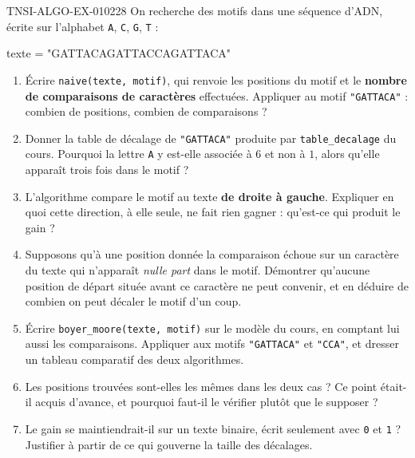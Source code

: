 \begin{exercice}{TNSI-ALGO-EX-010}{2}{28}
On recherche des motifs dans une séquence d'ADN, écrite sur l'alphabet
\lstinline{A}, \lstinline{C}, \lstinline{G}, \lstinline{T} :
\begin{python}
texte = "GATTACAGATTACCAGATTACA"
\end{python}
\begin{enumerate}
  \item Écrire \lstinline{naive(texte, motif)}, qui renvoie les positions du
    motif et le \textbf{nombre de comparaisons de caractères} effectuées.
    Appliquer au motif \lstinline{"GATTACA"} : combien de positions, combien de
    comparaisons ?
  \item Donner la table de décalage de \lstinline{"GATTACA"} produite par
    \lstinline{table_decalage} du cours. Pourquoi la lettre \lstinline{A} y
    est-elle associée à $6$ et non à $1$, alors qu'elle apparaît trois fois dans
    le motif ?
  \item L'algorithme compare le motif au texte \textbf{de droite à gauche}.
    Expliquer en quoi cette direction, à elle seule, ne fait rien gagner :
    qu'est-ce qui produit le gain ?
  \item Supposons qu'à une position donnée la comparaison échoue sur un
    caractère du texte qui n'apparaît \emph{nulle part} dans le motif.
    Démontrer qu'aucune position de départ située avant ce caractère ne peut
    convenir, et en déduire de combien on peut décaler le motif d'un coup.
  \item Écrire \lstinline{boyer_moore(texte, motif)} sur le modèle du cours, en
    comptant lui aussi les comparaisons. Appliquer aux motifs
    \lstinline{"GATTACA"} et \lstinline{"CCA"}, et dresser un tableau comparatif
    des deux algorithmes.
  \item Les positions trouvées sont-elles les mêmes dans les deux cas ? Ce point
    était-il acquis d'avance, et pourquoi faut-il le vérifier plutôt que le
    supposer ?
  \item Le gain se maintiendrait-il sur un texte binaire, écrit seulement avec
    \lstinline{0} et \lstinline{1} ? Justifier à partir de ce qui gouverne la
    taille des décalages.
\end{enumerate}
\end{exercice}
